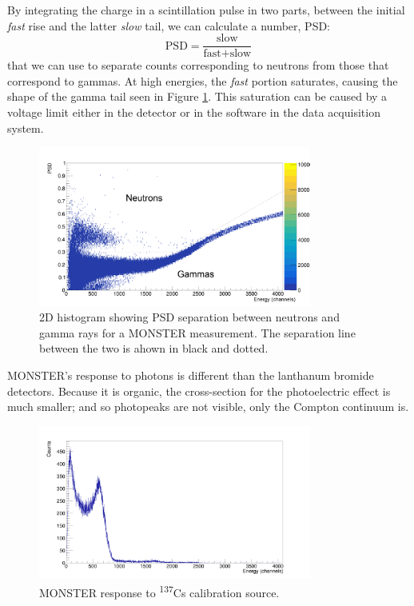 \documentclass[a4paper,12pt]{report}
\begin{document}
By integrating the charge in a scintillation pulse in two parts, between the initial \textit{fast} rise and the latter \textit{slow} tail, we can calculate a number, PSD:
\begin{equation}
	\text{PSD} = \frac{\text{slow}}{\text{fast}+\text{slow}}	%
\end{equation}
that we can use to separate counts corresponding to neutrons from those that correspond to gammas.
At high energies, the \textit{fast} portion saturates, causing the shape of the gamma tail seen in Figure \ref{example_psd}.
This saturation can be caused by a voltage limit either in the detector or in the software in the data acquisition system.

\begin{figure}[H]
	\centering
	\includegraphics[width=0.80\textwidth]{example_psd.png}
	\caption{2D histogram showing PSD separation between neutrons and gamma rays for a MONSTER measurement.
	The separation line between the two is ahown in black and dotted.}
	\label{example_psd}
\end{figure}

MONSTER's response to photons is different than the lanthanum bromide detectors.
Because it is organic, the cross-section for the photoelectric effect is much smaller; and so photopeaks are not visible, only the Compton continuum is.

\begin{figure}[H]
	\centering
	\includegraphics[width=0.80\textwidth]{monster_cs_calibration.png}
	\caption{MONSTER response to \textsuperscript{137}Cs calibration source.}
	\label{monster_cs_calibration}
\end{figure}
\end{document}
